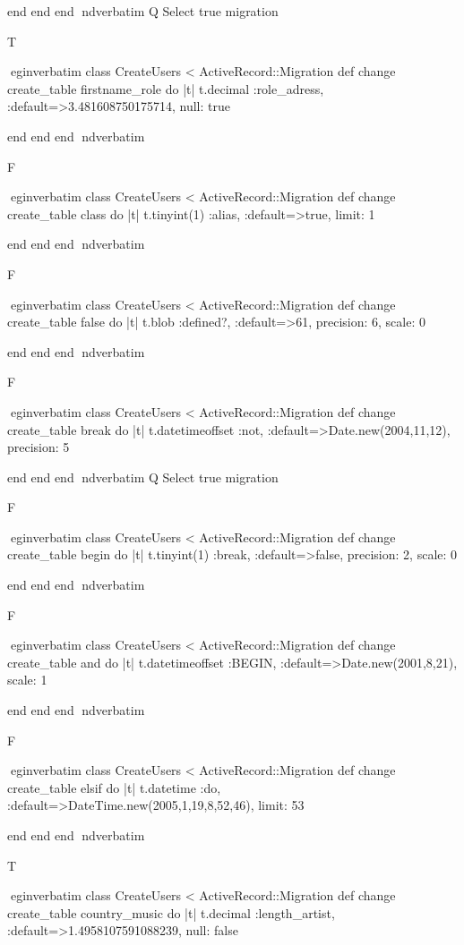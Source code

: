     end 
  end 
end
nd{verbatim}
Q
 Select true migration

T

egin{verbatim}
 class CreateUsers < ActiveRecord::Migration 
  def change 
    create_table firstname_role do |t| 
      t.decimal :role_adress, :default=>3.481608750175714, null: true
    
    end 
  end 
end
nd{verbatim}

F

egin{verbatim}
 class CreateUsers < ActiveRecord::Migration 
  def change 
    create_table class do |t| 
      t.tinyint(1) :alias, :default=>true, limit: 1
    
    end 
  end 
end
nd{verbatim}

F

egin{verbatim}
 class CreateUsers < ActiveRecord::Migration 
  def change 
    create_table false do |t| 
      t.blob :defined?, :default=>61, precision: 6, scale: 0
    
    end 
  end 
end
nd{verbatim}

F

egin{verbatim}
 class CreateUsers < ActiveRecord::Migration 
  def change 
    create_table break do |t| 
      t.datetimeoffset :not, :default=>Date.new(2004,11,12), precision: 5
    
    end 
  end 
end
nd{verbatim}
Q
 Select true migration

F

egin{verbatim}
 class CreateUsers < ActiveRecord::Migration 
  def change 
    create_table begin do |t| 
      t.tinyint(1) :break, :default=>false, precision: 2, scale: 0
    
    end 
  end 
end
nd{verbatim}

F

egin{verbatim}
 class CreateUsers < ActiveRecord::Migration 
  def change 
    create_table and do |t| 
      t.datetimeoffset :BEGIN, :default=>Date.new(2001,8,21), scale: 1
    
    end 
  end 
end
nd{verbatim}

F

egin{verbatim}
 class CreateUsers < ActiveRecord::Migration 
  def change 
    create_table elsif do |t| 
      t.datetime :do, :default=>DateTime.new(2005,1,19,8,52,46), limit: 53
    
    end 
  end 
end
nd{verbatim}

T

egin{verbatim}
 class CreateUsers < ActiveRecord::Migration 
  def change 
    create_table country_music do |t| 
      t.decimal :length_artist, :default=>1.4958107591088239, null: false
    
